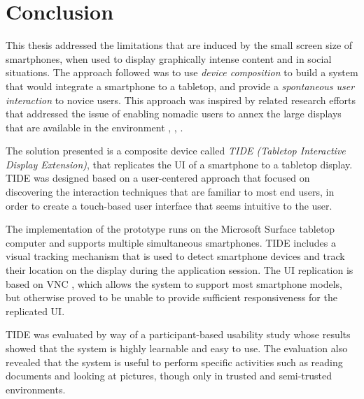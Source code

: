 \chapter{Conclusion}
\label{conclusion}

This thesis addressed the limitations that are induced by the small screen size of smartphones, when used to display graphically intense content and in social situations.
The approach followed was to use \emph{device composition} to build a system that would integrate a smartphone to a tabletop, and provide a \emph{spontaneous user interaction} to novice users.
This approach was inspired by related research efforts that addressed the issue of enabling nomadic users to annex the large displays that are available in the environment \citep{Want:2002:personalserver}, \citep{Arthur:2011:xice}, \citep{Baur:2012:virtualprojection}.

The solution presented is a composite device called \emph{TIDE (Tabletop Interactive Display Extension)}, that replicates the UI of a smartphone to a tabletop display.
TIDE was designed based on a user-centered approach that focused on discovering the interaction techniques that are familiar to most end users, in order to create a touch-based user interface that seems intuitive to the user.

The implementation of the prototype runs on the Microsoft Surface tabletop computer and supports multiple simultaneous smartphones.
TIDE includes a visual tracking mechanism that is used to detect smartphone devices and track their location on the display during the application session.
The UI replication is based on VNC \citep{Richardson:1998:vnc}, which allows the system to support most smartphone models, but otherwise proved to be unable to provide sufficient responsiveness for the replicated UI.

TIDE was evaluated by way of a participant-based usability study whose results showed that the system is highly learnable and easy to use.
The evaluation also revealed that the system is useful to perform specific activities such as reading documents and looking at pictures, though only in trusted and semi-trusted environments.



